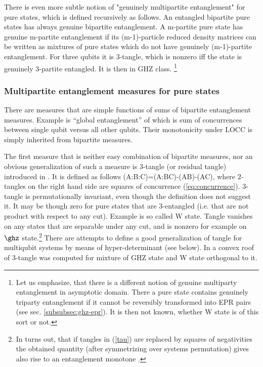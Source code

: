 \documentclass[rmp,12pt,preprint]{revtex4-2}
\begin{document}
There is even more subtle notion of "genuinely multipartite entanglement"
for pure states, which is defined recursively as follows.
An entangled bipartite pure states has always genuine
bipartite entanglement.
A m-partite pure state has genuine m-partite entanglement
if its (m-1)-particle reduced density matrices can be written as mixtures
of pure states which do not have genuinely
(m-1)-partite entanglement. For three qubits it is 3-tangle,
which is nonzero iff the state is genuinely 3-partite entangled.
It is then in GHZ class.  \footnote{Let us emphasize,
that there is a different notion of genuine multiparty entanglement
in asymptotic domain. There a pure state contains genuinely triparty entanglement
if it cannot be reversibly transformed into EPR pairs (see sec. \ref{subsubsec:ghz-epr}).
It is then not known, whether W state is of this sort or not.}


\subsubsection{Multipartite entanglement measures for pure states}
\label{subsubsec:multi-pure}

There are measures that are simple functions of sums of bipartite entanglement measures.
Example is ``global entanglement'' of  \cite{MeyerW2001-global} which is
sum of concurrences  between single qubit versus all other qubits.
Their monotonicity under LOCC is simply inherited from bipartite measures.

The first measure that is neither easy combination of bipartite measures,
nor an obvious generalization of such a measure is 3-tangle (or residual tangle)
introduced in \cite{CoffmanKW-tangle}.
It is defined as follows
\be
\tau(A:B:C)=\tau(A:BC)-\tau(AB)-\tau(AC),
\label{tau}
\ee
where $2$-tangles  on the right hand side
are squares of concurrence (\ref{eq:concurrence}). 3-tangle is permutationally invariant,
even though the definition does not suggest it.
It may be though zero  for pure states that are $3$-entangled (i.e. that
are not product with respect to any cut). Example is  so called W state. Tangle vanishes
on any states that are separable under any cut, and is nonzero for example on
$\ghz$ state.\footnote {In turns out, that if tangles in (\ref{tau}) are replaced by squares of negativities
the obtained quantity (after symmetrizing over systems permutation) gives also rise to an entanglement monotone \cite {OuF2007}.}
There are attempts to define a good generalization
of tangle for multiqubit systems  by means  of hyper-determinant \cite{Miyake2002-hyper}
(see below).  In \cite{LohmayerOSU2006-tangle} a convex roof of 3-tangle was computed for
mixture of GHZ state and W state orthogonal to it.
\end{document}
